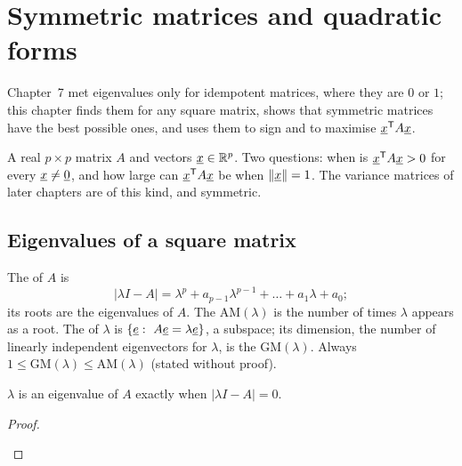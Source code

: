 \chapter{Symmetric matrices and quadratic forms}

Chapter~7 met eigenvalues only for idempotent matrices, where they are $0$ or $1$; this chapter finds them for any square matrix, shows that symmetric matrices have the best possible ones, and uses them to sign and to maximise $\underline{x}^{\mathsf{T}} A\underline{x}$.

\begin{setup}
A real $p\times p$ matrix $A$ and vectors $\underline{x}\in\mathbb{R}^p$. Two questions: when is $\underline{x}^{\mathsf{T}} A\underline{x}>0$ for every $\underline{x}\ne\underline{0}$, and how large can $\underline{x}^{\mathsf{T}} A\underline{x}$ be when $\|\underline{x}\|=1$. The variance matrices of later chapters are of this kind, and symmetric.
\end{setup}

\section{Eigenvalues of a square matrix}

\begin{definition}
The  of $A$ is
\[
  \boxed{\;|\lambda I-A|=\lambda^p+a_{p-1}\lambda^{p-1}+\dots+a_1\lambda+a_0;\;}
\]
its roots are the eigenvalues of $A$. The  $\text{AM}(\lambda)$ is the number of times $\lambda$ appears as a root. The  of $\lambda$ is $\{\vect{e}:\ A\vect{e}=\lambda\vect{e}\}$, a subspace; its dimension, the number of linearly independent eigenvectors for $\lambda$, is the  $\text{GM}(\lambda)$. Always $1\le\text{GM}(\lambda)\le\text{AM}(\lambda)$ (stated without proof).
\end{definition}

\begin{result}
$\lambda$ is an eigenvalue of $A$ exactly when $|\lambda I-A|=0$.
\end{result}
\begin{proof}
\begin{deriv}
\end{deriv}
\end{proof}


